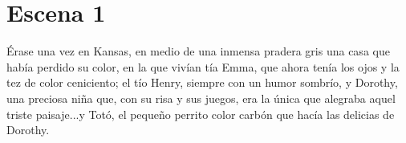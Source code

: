 \chapter{Escena 1}

Érase una vez en Kansas, en medio de una inmensa pradera gris una casa que había perdido su color, en la que vivían tía Emma, que ahora tenía los ojos y la tez de color ceniciento; el tío Henry, siempre con un humor sombrío, y Dorothy, una preciosa niña que, con su risa y sus juegos, era la única que alegraba aquel triste paisaje...y Totó, el pequeño perrito color carbón que hacía las delicias de Dorothy.
